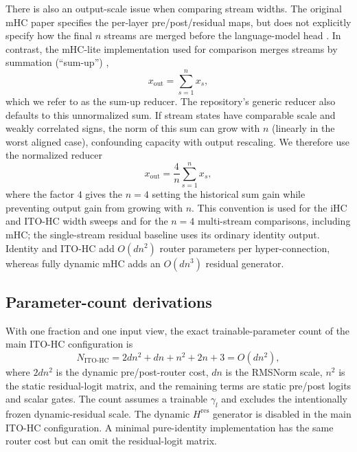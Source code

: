 \documentclass{article}
\newcommand{\Hres}{H^{\mathrm{res}}}
\begin{document}
There is also an output-scale issue when comparing stream widths. The original
mHC paper specifies the per-layer pre/post/residual maps, but does not
explicitly specify how the final $n$ streams are merged before the language-model
head \citep{xie2026mhc}. In contrast, the mHC-lite implementation used for
comparison merges streams by summation (``sum-up'') \citep{yang2026mhclite},
\begin{equation}
 x_{\mathrm{out}}=\sum_{s=1}^{n}x_s,
 \label{eq:sum-reducer}
\end{equation}
which we refer to as the sum-up reducer. The repository's generic reducer also
defaults to this unnormalized sum. If stream states have comparable scale and
weakly correlated signs, the norm of this sum can grow with $n$ (linearly in
the worst aligned case), confounding capacity with output rescaling. We
therefore use the normalized reducer
\begin{equation}
 x_{\mathrm{out}}=\frac{4}{n}\sum_{s=1}^{n}x_s,
 \label{eq:four-mean-reducer}
\end{equation}
where the factor $4$ gives the $n=4$ setting the historical sum gain while
preventing output gain from growing with $n$. This convention is used for
the iHC and ITO-HC width sweeps and for the $n=4$ multi-stream comparisons,
including mHC; the single-stream residual baseline uses its ordinary identity
output. Identity and ITO-HC add
$O(dn^2)$ router parameters per hyper-connection, whereas fully dynamic mHC
adds an $O(dn^3)$ residual generator.

\subsection{Parameter-count derivations}
\label{app:parameter-counts}
With one fraction and one input view, the exact trainable-parameter count of the main ITO-HC configuration is
\begin{equation}
 N_{\mathrm{ITO\text{-}HC}}=2dn^2+dn+n^2+2n+3=O(dn^2),
 \label{eq:ito-param-count}
\end{equation}
where $2dn^2$ is the dynamic pre/post-router cost, $dn$ is the RMSNorm scale, $n^2$ is the static residual-logit matrix, and the remaining terms are static pre/post logits and scalar gates. The count assumes a trainable $\gamma_l$ and excludes the intentionally frozen dynamic-residual scale. The dynamic $\Hres$ generator is disabled in the main ITO-HC configuration. A minimal pure-identity implementation has the same router cost but can omit the residual-logit matrix.
\end{document}
